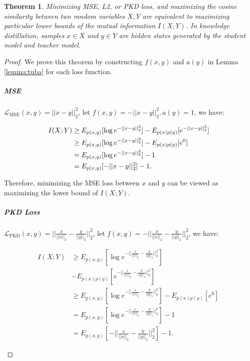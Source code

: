\documentclass[11pt]{article}
\newtheorem{theorem}{Theorem}
\begin{document}
\begin{theorem}
Minimizing MSE, L2, or PKD loss, and maximizing the cosine similarity between two random variables $X,Y$ are equivalent to maximizing particular lower bounds of the mutual information $I(X;Y)$. In knowledge distillation, samples $x \in X$ and $y \in Y$ are hidden states generated by the student model and teacher model.
\end{theorem} 

\begin{proof}
We prove this theorem by constructing $f(x,y)$ and $a(y)$ in Lemma \ref{lemma:tuba} for each loss function. 
\subparagraph{MSE}
$\mathcal{L}_{\text{MSE}}(x,y) = ||x-y||_2^2$, let $f(x,y) = -||x-y||_2^2, a(y)=1$, we have:
\begin{small}
\begin{equation}
\begin{split}
 I (X;Y)&\geq E_{p(x,y)}[\log e^{-||x-y||_2^2}] - E_{p(x)p(y)}[e^{-||x-y||_2^2}] \notag \\
&\geq  E_{p(x,y)}[\log e^{-||x-y||_2^2}] - E_{p(x)p(y)}[e^0]\\ 
&= E_{p(x,y)}[\log e^{-||x-y||_2^2}] - 1\\
&= E_{p(x,y)}[-||x-y||_2^2] - 1.
\end{split}
\end{equation}
\end{small}

Therefore, minimizing the MSE loss between $x$ and $y$ can be viewed as maximizing the lower bound of $I(X;Y)$.
\subparagraph{PKD Loss}
$\mathcal{L}_{\text{PKD}}(x, y) = ||\frac{x}{||x||_2}-\frac{y}{||y||_2}||_2^2$, let $f(x,y)=-||\frac{x}{||x||_2}-\frac{y}{||y||_2}||_2^2$, we have:
\begin{small}
\begin{equation*}
\begin{split}
 I (X;Y)&\geq E_{p(x,y)}[\log e^{-||\frac{x}{||x||_2}-\frac{y}{||y||_2}||_2^2}] \\
 &- E_{p(x)p(y)}[e^{-||\frac{x}{||x||_2}-\frac{y}{||y||_2}||_2^2}] \\
&\geq  E_{p(x,y)}[\log e^{-||\frac{x}{||x||_2}-\frac{y}{||y||_2}||_2^2}] - E_{p(x)p(y)}[e^0] \\ 
&= E_{p(x,y)}[\log e^{-||\frac{x}{||x||_2}-\frac{y}{||y||_2}||_2^2}] - 1\\
&= E_{p(x,y)}[-||\frac{x}{||x||_2}-\frac{y}{||y||_2}||_2^2] - 1 .
\end{split}
\end{equation*}
\end{small}


\end{proof}
\end{document}
